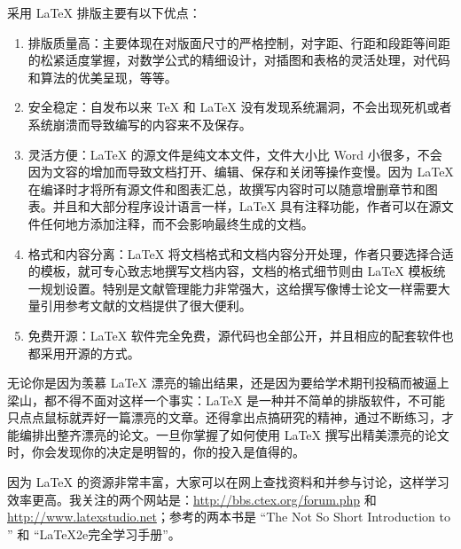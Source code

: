 采用 \LaTeX{} 排版主要有以下优点：
\begin{enumerate}
	\item 排版质量高：主要体现在对版面尺寸的严格控制，对字距、行距和段距等间距的松紧适度掌握，对数学公式的精细设计，对插图和表格的灵活处理，对代码和算法的优美呈现，等等。
	\item 安全稳定：自发布以来 \TeX{} 和 \LaTeX{} 没有发现系统漏洞，不会出现死机或者系统崩溃而导致编写的内容来不及保存。
	\item 灵活方便：\LaTeX{} 的源文件是纯文本文件，文件大小比 Word 小很多，不会因为文容的增加而导致文档打开、编辑、保存和关闭等操作变慢。因为 \LaTeX{} 在编译时才将所有源文件和图表汇总，故撰写内容时可以随意增删章节和图表。并且和大部分程序设计语言一样，\LaTeX{} 具有注释功能，作者可以在源文件任何地方添加注释，而不会影响最终生成的文档。
	\item 格式和内容分离：\LaTeX{} 将文档格式和文档内容分开处理，作者只要选择合适的模板，就可专心致志地撰写文档内容，文档的格式细节则由 \LaTeX{} 模板统一规划设置。特别是文献管理能力非常强大，这给撰写像博士论文一样需要大量引用参考文献的文档提供了很大便利。
	\item 免费开源：\LaTeX{} 软件完全免费，源代码也全部公开，并且相应的配套软件也都采用开源的方式。
\end{enumerate}

无论你是因为羡慕 LaTeX{} 漂亮的输出结果，还是因为要给学术期刊投稿而被逼上梁山，都不得不面对这样一个事实：\LaTeX{} 是一种并不简单的排版软件，不可能只点点鼠标就弄好一篇漂亮的文章。还得拿出点搞研究的精神，通过不断练习，才能编排出整齐漂亮的论文。一旦你掌握了如何使用 \LaTeX{} 撰写出精美漂亮的论文时，你会发现你的决定是明智的，你的投入是值得的。



因为 \LaTeX{} 的资源非常丰富，大家可以在网上查找资料和并参与讨论，这样学习效率更高。我关注的两个网站是：\url{http://bbs.ctex.org/forum.php} 和 \url{http://www.latexstudio.net}；参考的两本书是 ``The Not So Short Introduction to \LaTeXe'' 和 ``LaTeX2e完全学习手册''。
